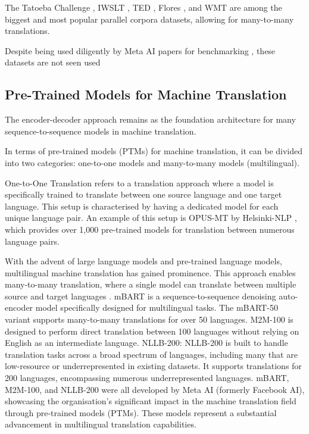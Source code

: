 \documentclass[a4paper]{article}
\begin{document}
The Tatoeba Challenge \cite{tiedemann-2020-tatoeba-challenge}, IWSLT \cite{agarwal-iwstl-2023}, TED \cite{ye-2018-word-embeddings-ted}, Flores \cite{goyal-2022-flores}, and WMT \cite{barrault-2020-wmt} are among the biggest and most popular parallel corpora datasets, allowing for many-to-many translations.

Despite being used diligently by Meta AI papers for benchmarking \cite{fan-2020-m2m100,nllb200-2020}, these datasets are not seen used

\subsection{Pre-Trained Models for Machine Translation}

The encoder-decoder approach \cite{cho-2014-properties} remains as the foundation architecture for many sequence-to-sequence models in machine translation.

In terms of pre-trained models (PTMs) for machine translation, it can be divided into two categories: one-to-one models and many-to-many models (multilingual).

One-to-One Translation refers to a translation approach where a model is specifically trained to translate between one source language and one target language. This setup is characterised by having a dedicated model for each unique language pair. An example of this setup is OPUS-MT by Helsinki-NLP \cite{tiedemann-2020-opus-mt}, which provides over 1,000 pre-trained models for translation between numerous language pairs.

With the advent of large language models and pre-trained language models, multilingual machine translation has gained prominence. This approach enables many-to-many translation, where a single model can translate between multiple source and target languages \cite{aharoni-2019-massively-multilingual}. mBART \cite{liu-2020-mbart} is a sequence-to-sequence denoising auto-encoder model specifically designed for multilingual tasks. The mBART-50 variant supports many-to-many translations for over 50 languages. M2M-100 \cite{fan-2020-m2m100} is designed to perform direct translation between 100 languages without relying on English as an intermediate language. NLLB-200: NLLB-200 \cite{nllb200-2020} is built to handle translation tasks across a broad spectrum of languages, including many that are low-resource or underrepresented in existing datasets. It supports translations for 200 languages, encompassing numerous underrepresented languages. mBART, M2M-100, and NLLB-200 were all developed by Meta AI (formerly Facebook AI), showcasing the organisation's significant impact in the machine translation field through pre-trained models (PTMs). These models represent a substantial advancement in multilingual translation capabilities.
\end{document}
